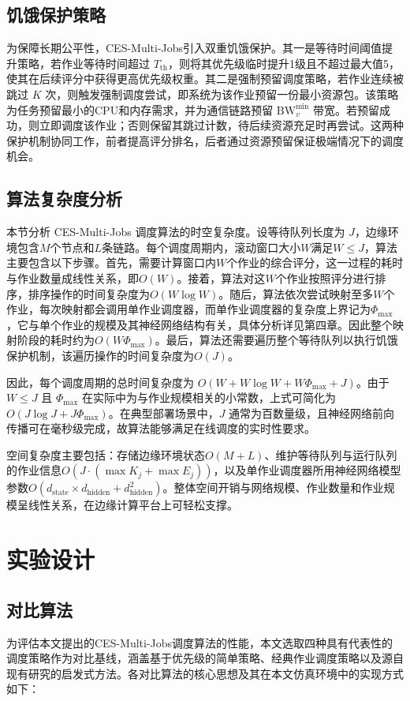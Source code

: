 \subsection{饥饿保护策略}
为保障长期公平性，CES-Multi-Jobs引入双重饥饿保护。其一是等待时间阈值提升策略，若作业等待时间超过 $T_{\text{th}}$，则将其优先级临时提升1级且不超过最大值5，使其在后续评分中获得更高优先级权重。其二是强制预留调度策略，若作业连续被跳过 $K$ 次，则触发强制调度尝试，即系统为该作业预留一份最小资源包。该策略为任务预留最小的CPU和内存需求，并为通信链路预留 $\text{BW}_v^{\min}$ 带宽。若预留成功，则立即调度该作业；否则保留其跳过计数，待后续资源充足时再尝试。这两种保护机制协同工作，前者提高评分排名，后者通过资源预留保证极端情况下的调度机会。

\subsection{算法复杂度分析}
本节分析 CES-Multi-Jobs 调度算法的时空复杂度。设等待队列长度为 $J$，边缘环境包含$M$个节点和$L$条链路。每个调度周期内，滚动窗口大小$W$满足$W \le J$，算法主要包含以下步骤。首先，需要计算窗口内$W$个作业的综合评分，这一过程的耗时与作业数量成线性关系，即$O(W)$。接着，算法对这$W$个作业按照评分进行排序，排序操作的时间复杂度为$O(W \log W)$。随后，算法依次尝试映射至多$W$个作业，每次映射都会调用单作业调度器，而单作业调度器的复杂度上界记为$\Phi_{\max}$，它与单个作业的规模及其神经网络结构有关，具体分析详见第四章。因此整个映射阶段的耗时约为$O(W \Phi_{\max})$。最后，算法还需要遍历整个等待队列以执行饥饿保护机制，该遍历操作的时间复杂度为$O(J)$。

因此，每个调度周期的总时间复杂度为 $O(W + W \log W + W \Phi_{\max} + J)$。由于 $W \le J$ 且 $\Phi_{\max}$ 在实际中为与作业规模相关的小常数，上式可简化为 $O(J \log J + J \Phi_{\max})$。在典型部署场景中，$J$ 通常为百数量级，且神经网络前向传播可在毫秒级完成，故算法能够满足在线调度的实时性要求。

空间复杂度主要包括：存储边缘环境状态$O(M+L)$、维护等待队列与运行队列的作业信息$O(J \cdot (\max K_j + \max E_j))$，以及单作业调度器所用神经网络模型参数$O(d_{\text{state}} \times d_{\text{hidden}} + d_{\text{hidden}}^2)$。整体空间开销与网络规模、作业数量和作业规模呈线性关系，在边缘计算平台上可轻松支撑。

\section{实验设计}
\subsection{对比算法}
为评估本文提出的CES-Multi-Jobs调度算法的性能，本文选取四种具有代表性的调度策略作为对比基线，涵盖基于优先级的简单策略、经典作业调度策略以及源自现有研究的启发式方法。各对比算法的核心思想及其在本文仿真环境中的实现方式如下：

